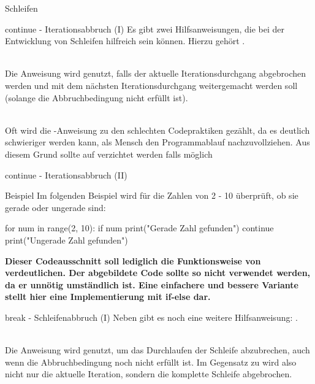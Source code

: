 \begin{subsection}{Schleifen}
        
        \begin{frame}{continue - Iterationsabbruch (I)}
            Es gibt zwei Hilfsanweisungen, die bei der Entwicklung von Schleifen hilfreich sein können. Hierzu gehört .\\~\
            
            Die  Anweisung wird genutzt, falls der aktuelle Iterationsdurchgang abgebrochen werden und mit dem nächsten Iterationsdurchgang weitergemacht werden soll (solange die Abbruchbedingung nicht erfüllt ist). \\~\
            
            Oft wird die -Anweisung zu den schlechten Codepraktiken gezählt, da es deutlich schwieriger werden kann, als Mensch den Programmablauf nachzuvollziehen. Aus diesem Grund sollte auf  verzichtet werden falls möglich
        \end{frame}
        
        \begin{frame}[fragile]{continue - Iterationsabbruch (II)}
            
            \begin{exampleblock}{Beispiel}
                Im folgenden Beispiel wird für die Zahlen von 2 - 10 überprüft, ob sie gerade oder ungerade sind:
                
\begin{pythoncode}
for num in range(2, 10):
    if num %
        print("Gerade Zahl gefunden")
        continue
    print("Ungerade Zahl gefunden")
\end{pythoncode}
                
                \textbf{Dieser Codeausschnitt soll lediglich die Funktionsweise von  verdeutlichen. Der abgebildete Code sollte so nicht verwendet werden, da er unnötig umständlich ist. Eine einfachere und bessere Variante stellt hier eine Implementierung mit if-else dar.}
            \end{exampleblock}
        \end{frame}
        
        \begin{frame}{break - Schleifenabbruch (I)}
            Neben  gibt es noch eine weitere Hilfsanweisung:  .\\~\
            
            Die  Anweisung wird genutzt, um das Durchlaufen der Schleife abzubrechen, auch wenn die Abbruchbedingung noch nicht erfüllt ist. Im Gegensatz zu  wird also nicht nur die aktuelle Iteration, sondern die komplette Schleife abgebrochen.  \\~\
            

\end{frame}
\end{subsection}
